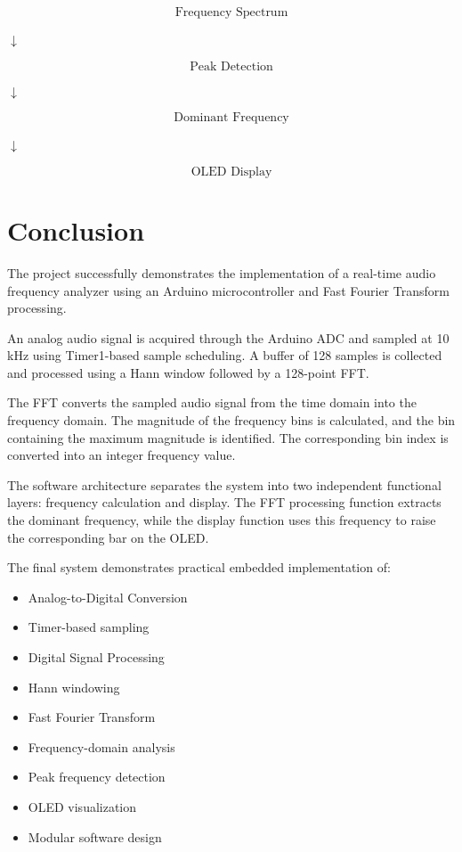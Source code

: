 \documentclass{article}
\begin{document}
\begin{center}
\begin{center}
\[
\boxed{\text{Frequency Spectrum}}
\]

$\downarrow$

\[
\boxed{\text{Peak Detection}}
\]

$\downarrow$

\[
\boxed{\text{Dominant Frequency}}
\]

$\downarrow$

\[
\boxed{\text{OLED Display}}
\]

\end{center}


\section{Conclusion}

The project successfully demonstrates the implementation of a real-time audio frequency analyzer using an Arduino microcontroller and Fast Fourier Transform processing.

An analog audio signal is acquired through the Arduino ADC and sampled at 10 kHz using Timer1-based sample scheduling. A buffer of 128 samples is collected and processed using a Hann window followed by a 128-point FFT.

The FFT converts the sampled audio signal from the time domain into the frequency domain. The magnitude of the frequency bins is calculated, and the bin containing the maximum magnitude is identified. The corresponding bin index is converted into an integer frequency value.

The software architecture separates the system into two independent functional layers: frequency calculation and display. The FFT processing function extracts the dominant frequency, while the display function uses this frequency to raise the corresponding bar on the OLED.

The final system demonstrates practical embedded implementation of:

\begin{itemize}
    \item Analog-to-Digital Conversion
    \item Timer-based sampling
    \item Digital Signal Processing
    \item Hann windowing
    \item Fast Fourier Transform
    \item Frequency-domain analysis
    \item Peak frequency detection
    \item OLED visualization
    \item Modular software design
\end{itemize}


\end{center}
\end{document}
